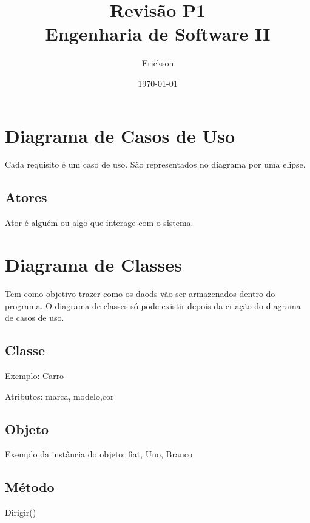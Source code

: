 \documentclass[12pt, a4paper]{article}
\title{Revisão P1\\Engenharia de Software II}
\author{Erickson}
\date{\today}
\begin{document}
	\maketitle
	\newpage
	
	\section{Diagrama de Casos de Uso}
		Cada requisito é um caso de uso. São representados no diagrama por uma elipse.
		\subsection{Atores}
			Ator é alguém ou algo que interage com o sistema.
	\section{Diagrama de Classes}
		Tem como objetivo trazer como os daods vão ser armazenados dentro do programa. O diagrama de classes só pode existir depois da criação do diagrama de casos de uso.
		\subsection{Classe}
			Exemplo: Carro

			Atributos: marca, modelo,cor

		\subsection{Objeto}
			Exemplo da instância do objeto: fiat, Uno, Branco

		\subsection{Método}
			Dirigir()
		
\end{document}
